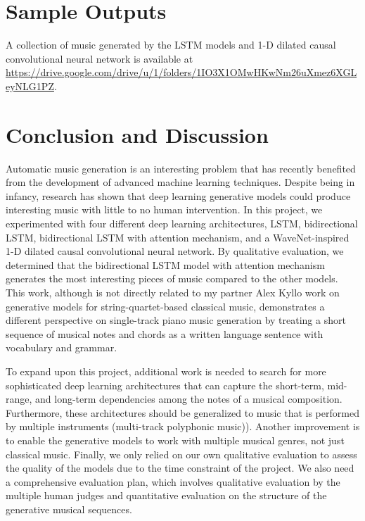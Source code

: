 \documentclass[sigconf,authorversion]{acmart}
\begin{document}
\section{Sample Outputs}

A collection of music generated by the LSTM models and 1-D dilated causal convolutional 
neural network is available at 
\sloppy
\url{https://drive.google.com/drive/u/1/folders/1IO3X1OMwHKwNm26uXmez6XGLeyNLG1PZ}.

\section{Conclusion and Discussion}

Automatic music generation is an interesting problem that has recently benefited from the
development of advanced machine learning techniques. Despite being in infancy,
research has shown that deep learning generative models could produce interesting music 
with little to no human intervention. In this project, we experimented with four different
deep learning architectures, LSTM, bidirectional LSTM, bidirectional LSTM with attention
mechanism, and a WaveNet-inspired 1-D dilated causal convolutional neural network. By 
qualitative evaluation, we determined that the bidirectional LSTM model with attention 
mechanism generates the most interesting pieces of music compared to the other models.
This work, although is not directly related to my partner Alex Kyllo work on generative
models for string-quartet-based classical music, demonstrates a different perspective 
on single-track piano music generation by treating a short sequence of musical notes
and chords as a written language sentence with vocabulary and grammar.

To expand upon this project, additional work is needed to search for more sophisticated
deep learning architectures that can capture the short-term, mid-range, and long-term 
dependencies among the notes of a musical composition. Furthermore, these architectures 
should be generalized to music that is performed by multiple instruments (multi-track 
polyphonic music)). Another improvement is to enable the generative models to work with
multiple musical genres, not just classical music. Finally, we only relied on our own
qualitative evaluation to assess the quality of the models due to the time constraint
of the project. We also need a comprehensive evaluation plan, which involves qualitative evaluation 
by the multiple human judges and quantitative evaluation on the structure of the generative 
musical sequences.



\end{document}
